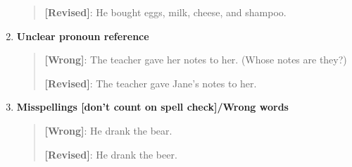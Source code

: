 \begin{enumerate}
\begin{quote}
\textbf{[Revised]}: He bought eggs, milk, cheese, and shampoo. 
\end{quote}


\item \textbf{Unclear pronoun reference}
\begin{quote}
\textbf{[Wrong]}: The teacher gave her notes to her. (Whose notes are they?)

\textbf{[Revised]}: The teacher gave Jane's notes to her.
\end{quote}
\item \textbf{Misspellings [don't count on spell check]/Wrong words}
\begin{quote}
\textbf{[Wrong]}: He drank the bear.

\textbf{[Revised]}: He drank the beer.
\end{quote}
\end{enumerate}

